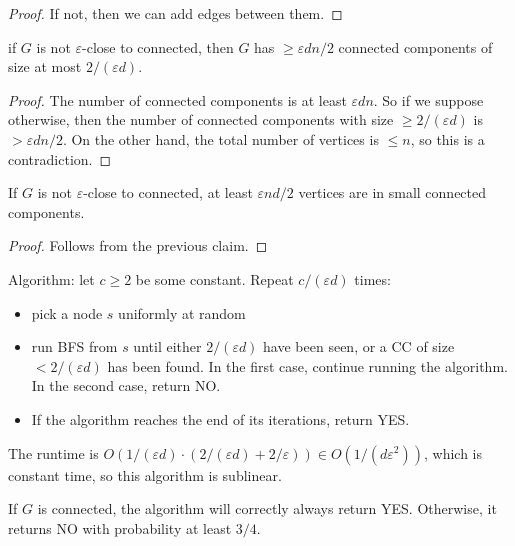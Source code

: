 \begin{proof}
If not, then we can add edges between them. 
\end{proof}

\begin{theorem}
\claimlabel

if $G$ is not $\varepsilon$-close to connected, then $G$ has $\geq \varepsilon dn/2$ connected components of size at most $2/(\varepsilon d)$.
\end{theorem}

\begin{proof}
The number of connected components is at least $\varepsilon dn$. So if we suppose otherwise, then the number of connected components with size $\geq 2/(\varepsilon d)$ is $> \varepsilon dn/2$. On the other hand, the total number of vertices is $\leq n$, so this is a contradiction.    
\end{proof}

\begin{theorem}
\claimlabel

If $G$ is not $\varepsilon$-close to connected, at least $\varepsilon nd/2$ vertices are in small connected components. 
\end{theorem}

\begin{proof}
Follows from the previous claim. 
\end{proof}

\hrulebar

Algorithm: let $c\geq 2$ be some constant. Repeat $c/(\varepsilon d)$ times: 
\begin{itemize}
    \item pick a node $s$ uniformly at random
    \item run BFS from $s$ until either $2/(\varepsilon d)$ have been seen, or a CC of size $<2/(\varepsilon d)$ has been found. In the first case, continue running the algorithm. In the second case, return NO. 
    \item If the algorithm reaches the end of its iterations, return YES. 
\end{itemize}

The runtime is $O(1/(\varepsilon d)\cdot (2/(\varepsilon d) + 2/\varepsilon))\in O(1/(d\varepsilon^2))$, which is constant time, so this algorithm is sublinear.

\begin{theorem}
\claimlabel

If $G$ is connected, the algorithm will correctly always return YES. Otherwise, it returns NO with probability at least $3/4$. 
\end{theorem}

